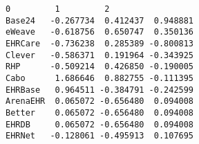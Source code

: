 \documentclass[11pt]{article}
\makeatletter
\newcommand{\boxspacing}{\kern\kvtcb@left@rule\kern\kvtcb@boxsep}
\newcommand{\prompt}[4]{
        \ttfamily\llap{{\color{#2}[#3]:\hspace{3pt}#4}}\vspace{-\baselineskip}
    }
\makeatother
\begin{document}
            \begin{tcolorbox}[breakable, size=fbox, boxrule=.5pt, pad at break*=1mm, opacityfill=0]
\prompt{Out}{outcolor}{558}{\boxspacing}
\begin{Verbatim}[commandchars=\\\{\}]
                 0         1         2
Base24   -0.267734  0.412437  0.948881
eWeave   -0.618756  0.650747  0.350136
EHRCare  -0.736238  0.285389 -0.800813
Clever   -0.586371  0.191964 -0.343925
RHP      -0.509214  0.426850 -0.190005
Cabo      1.686646  0.882755 -0.111395
EHRBase   0.964511 -0.384791 -0.242599
ArenaEHR  0.065072 -0.656480  0.094008
Better    0.065072 -0.656480  0.094008
EHRDB     0.065072 -0.656480  0.094008
EHRNet   -0.128061 -0.495913  0.107695
\end{Verbatim}
\end{tcolorbox}
        
\end{document}
